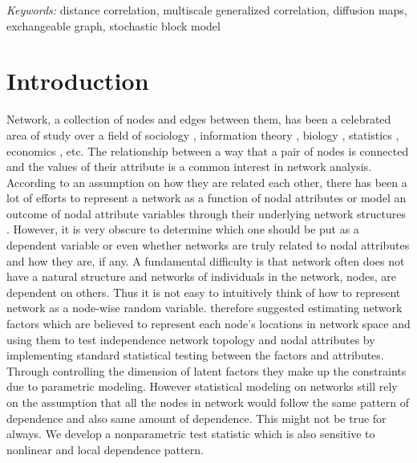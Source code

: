 \documentclass[12pt]{article}
\theoremstyle{definition}
\begin{document}
	\noindent%
	{\it Keywords:} distance correlation, multiscale generalized correlation, diffusion maps, exchangeable graph, stochastic block model 
	\vfill
	
	\newpage
	\section{Introduction}
	\label{sec:intro}
	
Network, a collection of nodes and edges between them, has been a celebrated area of study over a field of sociology \citep{pinquart2000influences, ellison2007benefits}, information theory \citep{gross2005information}, biology \citep{barabasi2004network, pujol2010unveiling}, statistics \citep{raftery2012fast, palla2012infinite}, economics \citep{banerjee2013diffusion}, etc. The relationship between a way that a pair of nodes is connected and the values of their attribute is a common interest in network analysis. According to an assumption on how they are related each other, there has been a lot of efforts to represent a network as a function of nodal attributes \citep{wasserman1996logit, howard2016understanding} or model an outcome of nodal attribute variables through their underlying network structures \citep{christakis2007spread, christakis2008collective}. However, it is very obscure to determine which one should be put as a dependent variable or even whether networks are truly related to nodal attributes and how they are, if any. A fundamental difficulty is that network often does not have a natural structure and networks of individuals in the network, nodes, are dependent on others. Thus it is not easy to intuitively think of how to represent network as a node-wise random variable. \cite{fosdick2015testing} therefore suggested estimating network factors which are believed to represent each node's locations in network space and using them to test independence network topology and nodal attributes by implementing standard statistical testing between the factors and attributes. Through controlling the dimension of latent factors they make up the constraints due to parametric modeling. However statistical modeling on networks still rely on the assumption that all the nodes in network would follow the same pattern of dependence and also same amount of dependence. This might not be true for always. We develop a nonparametric test statistic which is also sensitive to nonlinear and local dependence pattern.  
	
\end{document}
